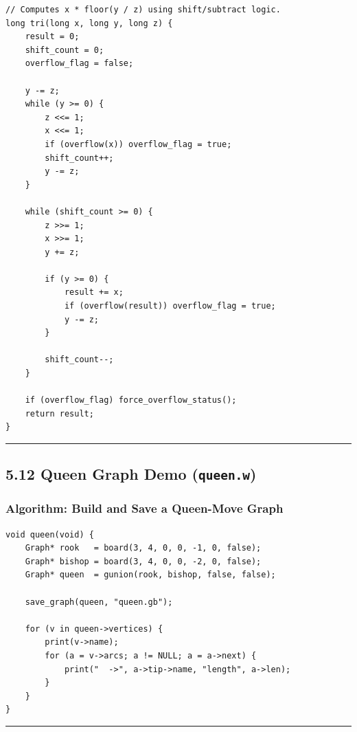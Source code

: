 \documentclass[11pt]{article}
\begin{document}
\begin{verbatim}
// Computes x * floor(y / z) using shift/subtract logic.
long tri(long x, long y, long z) {
    result = 0;
    shift_count = 0;
    overflow_flag = false;

    y -= z;
    while (y >= 0) {
        z <<= 1;
        x <<= 1;
        if (overflow(x)) overflow_flag = true;
        shift_count++;
        y -= z;
    }

    while (shift_count >= 0) {
        z >>= 1;
        x >>= 1;
        y += z;

        if (y >= 0) {
            result += x;
            if (overflow(result)) overflow_flag = true;
            y -= z;
        }

        shift_count--;
    }

    if (overflow_flag) force_overflow_status();
    return result;
}
\end{verbatim}

\begin{center}\rule{0.5\linewidth}{0.5pt}\end{center}

\subsection{\texorpdfstring{5.12 Queen Graph Demo (\texttt{queen.w})}{5.12 Queen Graph Demo (queen.w)}}\label{queen-graph-demo-queen.w}

\subsubsection{Algorithm: Build and Save a Queen-Move Graph}\label{algorithm-build-and-save-a-queen-move-graph}

\begin{verbatim}
void queen(void) {
    Graph* rook   = board(3, 4, 0, 0, -1, 0, false);
    Graph* bishop = board(3, 4, 0, 0, -2, 0, false);
    Graph* queen  = gunion(rook, bishop, false, false);

    save_graph(queen, "queen.gb");

    for (v in queen->vertices) {
        print(v->name);
        for (a = v->arcs; a != NULL; a = a->next) {
            print("  ->", a->tip->name, "length", a->len);
        }
    }
}
\end{verbatim}

\begin{center}\rule{0.5\linewidth}{0.5pt}\end{center}
\end{document}
